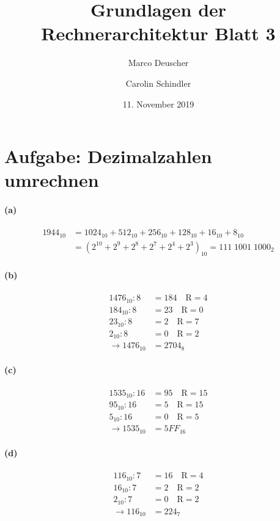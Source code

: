 \documentclass[a4paper]{article}
\title{Grundlagen der Rechnerarchitektur Blatt 3}
\author{Marco Deuscher \and Carolin Schindler}
\date{11. November 2019}
\begin{document}
\maketitle
\section{Aufgabe: Dezimalzahlen umrechnen}
\paragraph{(a)}
\begin{align*} 
	1944_{10} & = 1024_{10} + 512_{10} + 256_{10} + 128_{10} + 16_{10} + 8_{10}\\ 
			  & = (2^{10}+2^9+2^8+2^7+2^4+2^3)_{10} = 111\;1001\;1000_2
\end{align*}

\paragraph{(b)}
\begin{align*}
	1476_{10} : 8 &= 184 \quad \text{R}=4\\
	184_{10} : 8 &= 23 \quad \text{R}=0\\
	23_{10} : 8 &= 2 \quad \text{R}=7\\
	2_{10} : 8 &= 0 \quad \text{R}=2\\
	\rightarrow 1476_{10} &= 2704_{8}
\end{align*}


\paragraph{(c)}
\begin{align*}
	1535_{10} : 16 &= 95 \quad \text{R}=15\\
	95_{10} : 16 &= 5 \quad \text{R}=15\\
	5_{10} : 16 &= 0 \quad \text{R}=5\\
	\rightarrow 1535_{10} &= 5FF_{16} 
\end{align*}

\paragraph{(d)}
\begin{align*}
	116_{10} : 7 &= 16 \quad \text{R}=4\\
	16_{10} : 7 &= 2 \quad \text{R}=2\\
	2_{10} : 7 &= 0 \quad \text{R}=2\\
	\rightarrow 116_{10} &= 224_7
\end{align*}
\end{document}
